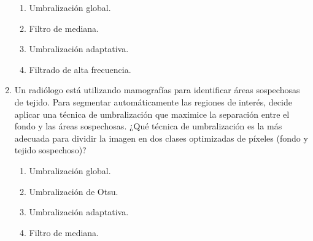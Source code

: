 \documentclass[12pt,a4paper]{article}
\providecommand{\tightlist}{%
  \setlength{\itemsep}{0pt}\setlength{\parskip}{0pt}}\usepackage{longtable,booktabs,array}
\providecommand{\tightlist}{%
  \setlength{\itemsep}{0pt}\setlength{\parskip}{2pt}}
\begin{document}
\begin{enumerate}
  \begin{enumerate}
  \tightlist
  \item
    Umbralización global.
  \item
    Filtro de mediana.
  \item
    Umbralización adaptativa.
  \item
    Filtrado de alta frecuencia.
  \end{enumerate}
\item
  Un radiólogo está utilizando mamografías para identificar áreas
  sospechosas de tejido. Para segmentar automáticamente las regiones de
  interés, decide aplicar una técnica de umbralización que maximice la
  separación entre el fondo y las áreas sospechosas. ¿Qué técnica de
  umbralización es la más adecuada para dividir la imagen en dos clases
  optimizadas de píxeles (fondo y tejido sospechoso)?

  \begin{enumerate}
  \tightlist
  \item
    Umbralización global.
  \item
    Umbralización de Otsu.
  \item
    Umbralización adaptativa.
  \item
    Filtro de mediana.
  \end{enumerate}
\end{enumerate}
\end{document}

